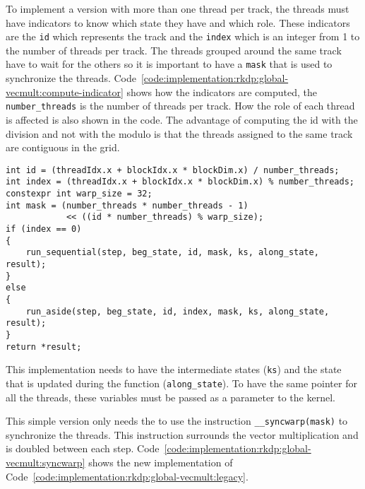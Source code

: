 To implement a version with more than one thread per track, the threads must
have indicators to know which state they have and which role.
These indicators are the \texttt{id} which represents the track and
the \texttt{index} which is an integer from 1 to the number of threads per track.
The threads grouped around the same track have to wait for the others so it is
important to have a \texttt{mask} that is used to synchronize the threads.
Code~\ref{code:implementation:rkdp:global-vecmult:compute-indicator} shows how
the indicators are computed, the \texttt{number\_threads} is the number of
threads per track.
How the role of each thread is affected is also shown in the code.
The advantage of computing the id with the division and not with the modulo is
that the threads assigned to the same track are contiguous in the grid.

\begin{code}
    \label{code:implementation:rkdp:global-vecmult:compute-indicator}
    \begin{verbatim}
int id = (threadIdx.x + blockIdx.x * blockDim.x) / number_threads;
int index = (threadIdx.x + blockIdx.x * blockDim.x) % number_threads;
constexpr int warp_size = 32;
int mask = (number_threads * number_threads - 1)
            << ((id * number_threads) % warp_size);
if (index == 0)
{
    run_sequential(step, beg_state, id, mask, ks, along_state, result);
}
else
{
    run_aside(step, beg_state, id, index, mask, ks, along_state, result);
}
return *result;
    \end{verbatim}
\end{code}

This implementation needs to have the intermediate states (\texttt{ks}) and the
state that is updated during the function (\texttt{along\_state}).
To have the same pointer for all the threads, these variables must be passed
as a parameter to the kernel.

This simple version only needs the to use the instruction \texttt{\_\_syncwarp(mask)}
to synchronize the threads.
This instruction surrounds the vector multiplication and is doubled between each
step.
Code~\ref{code:implementation:rkdp:global-vecmult:syncwarp} shows the new
implementation of Code~\ref{code:implementation:rkdp:global-vecmult:legacy}.

